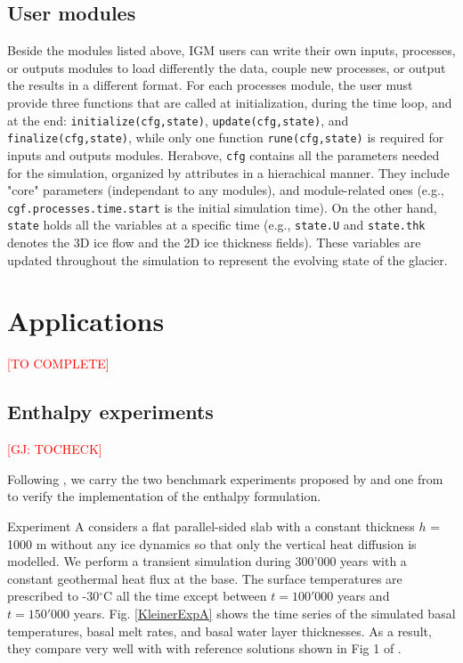 \documentclass[gmd]{copernicus}
\begin{document}
\subsection{User modules}
\label{user_modules}

Beside the modules listed above, IGM users can write their own inputs, processes, or outputs modules to load differently the data, couple new processes, or output the results in a different format. For each processes module, the user must provide three functions that are called at initialization, during the time loop, and at the end: \texttt{initialize(cfg,state)}, \texttt{update(cfg,state)}, and \texttt{finalize(cfg,state)}, while only one function \texttt{rune(cfg,state)} is required for inputs and outputs modules.  Herabove, \texttt{cfg} contains all the parameters needed for the simulation, organized by attributes in a hierachical manner. They include "core" parameters (independant to any modules), and module-related ones (e.g., \texttt{cgf.processes.time.start} is the initial simulation time). On the other hand, \texttt{state} holds all the variables at a specific time (e.g., \texttt{state.U} and \texttt{state.thk} denotes the 3D ice flow and the 2D ice thickness fields). These variables are updated throughout the simulation to represent the evolving state of the glacier.

\section{Applications} 

\textcolor{red}{[TO COMPLETE]} 



\subsection{Enthalpy experiments}

\textcolor{red}{[GJ: TOCHECK]} 

Following \citep{wang2020two}, we carry the two benchmark experiments proposed by 
\citep{kleiner2015enthalpy} and one from \citep{hewitt2017models} to
verify the implementation of the enthalpy formulation.

Experiment A considers a flat parallel-sided slab with a constant thickness $h$ = 1000 m
without any ice dynamics so that only the vertical heat diffusion is modelled. We perform
a transient simulation during 300'000 years with a constant geothermal heat flux at the base. 
The surface temperatures are prescribed to -30$^{\circ}$C all the time except between
$t=100'000$ years and $t=150'000$ years. Fig. \ref{KleinerExpA} 
shows the time series of the simulated basal temperatures,
basal melt rates, and basal water layer thicknesses. As a result, they compare very well with 
with reference solutions shown in Fig 1 of \citep{kleiner2015enthalpy}. 
\end{document}
